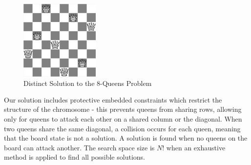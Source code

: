 \documentclass[conference]{IEEEtran}
\begin{document}
\begin{figure}[h!]
\centerline{\includegraphics[width=0.35\textwidth]{figures/8_queens_solution.png}}
\caption{Distinct Solution to the 8-Queens Problem}
\label{fig:solution}
\end{figure}



Our solution includes protective embedded constraints which restrict the structure of the chromosome - this prevents queens from sharing rows, allowing only for queens to attack each other on a shared column or the diagonal. When two queens share the same diagonal, a collision occurs for each queen, meaning that the board state is not a solution. A solution is found when no queens on the board can attack another. The search space size is {$N!$} when an exhaustive method is applied to find all possible solutions. 
\end{document}

